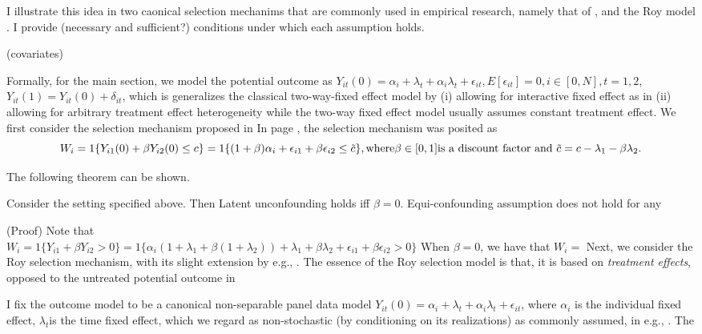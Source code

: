 \documentclass{article}
\begin{document}
I illustrate this idea in two caonical selection mechanims that are commonly used in empirical research, namely that of \cite{ashenfelter1985susing}, and the Roy model \cite{roy1951some}.
I provide \koko(necessary and sufficient?) conditions under which each assumption holds.

\koko(covariates)

Formally, for the main section, we model the potential outcome as $Y_{it} ( 0) = \alpha_i + \lambda_t + \alpha_i \lambda_t +\epsilon_{it}  , E[ \epsilon_{it} ] = 0 , i \in [0, N] , t =1,2$, $Y_{it}(1) = Y_{it}(0) + \delta_{it} $, which is generalizes the classical two-way-fixed effect model by (i) allowing for interactive fixed effect as in \cite{bai2009panel,abadie2021using}(ii) allowing for arbitrary treatment effect heterogeneity while the two-way fixed effect model usually assumes constant treatment effect. 
We first consider the selection mechanism proposed in \cite{ashenfelter1985susing} 
In \cite{ashenfelter1985susing} page \koko , the selection mechanism was posited as 
\begin{equation}
    W_i = 1\{ Y_{i1}(0) + \beta Y_{i2} ( 0) \leq c \} =  1 \{  (1 + \beta ) \alpha_i + \epsilon_{i1} + \beta \epsilon_{i2} \leq \tilde{c} \} ,\\
    \text{where} \beta \in [0,1] \text{is a discount factor and } \tilde{c} = c - \lambda_1 - \beta \lambda_2 .\\
    
\end{equation}

The following theorem can be shown.
\begin{theorem}
Consider the setting specified above. Then Latent unconfounding holds iff $\beta =0$. Equi-confounding assumption does not hold for any 
\end{theorem}
(Proof)
Note that\\
$W_i = 1\{ Y_{i1} + \beta Y_{i2} > 0\} = 1\{ \alpha_i ( 1 + \lambda_1 + \beta( 1 + \lambda_2 ) ) + \lambda_1 + \beta \lambda_2 + \epsilon_{i1} + \beta \epsilon_{i2} > 0 \} $
When $\beta=0$, we have that $W_i =$
Next, we consider the Roy selection mechanism\cite{roy1951some}, with its slight extension by e.g., \cite{heckman1984method} . The essence of the Roy selection model is that, it is based on \textit{treatment effects}, opposed to the untreated potential outcome in \cite{card ashenfelter}



I fix the outcome model to be a canonical non-separable panel data model $Y_{it} (0) = \alpha_i + \lambda_t + \alpha_i \lambda_t + \epsilon_{it} $, where $\alpha_i $ is the individual fixed effect, $\lambda_t$is the time fixed effect, which we regard as non-stochastic (by conditioning on its realizations) as commonly assumed, in e.g., \cite{citeghanem2022, bonhomme}. The 
\end{document}
